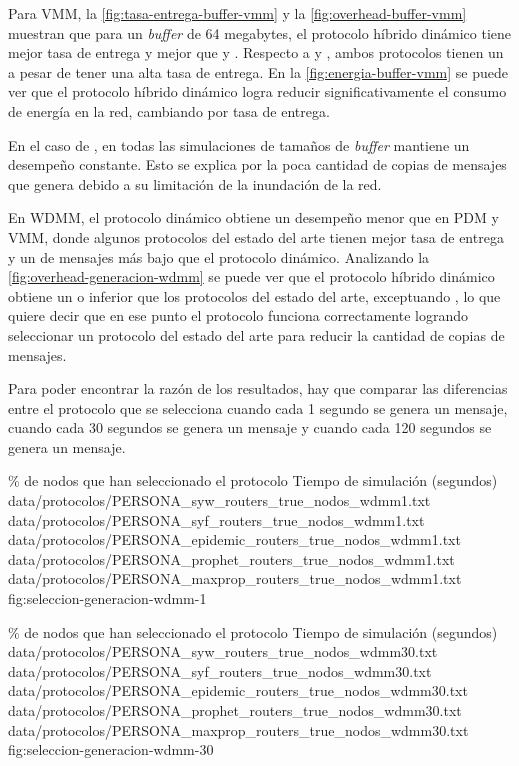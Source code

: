 Para VMM, la \ref{fig:tasa-entrega-buffer-vmm} y la
\ref{fig:overhead-buffer-vmm} muestran que para un \textit{buffer} de 64
megabytes, el protocolo híbrido dinámico tiene mejor tasa de entrega y mejor
\overhead{} que \prophet{} y \epidemic. Respecto a \maxprop{} y \syf, ambos
protocolos tienen un \overhead{} a pesar de tener una alta tasa de entrega. En
la \ref{fig:energia-buffer-vmm} se puede ver que el protocolo híbrido dinámico
logra reducir significativamente el consumo de energía en la red, cambiando
\overhead{} por tasa de entrega.


En el caso de \syw, en todas las simulaciones de tamaños de \textit{buffer}
mantiene un desempeño constante. Esto se explica por la poca cantidad de copias
de mensajes que genera debido a su limitación de la inundación de la red.




En WDMM, el protocolo dinámico obtiene un desempeño menor que en PDM y VMM,
donde algunos protocolos del estado del arte tienen mejor tasa de entrega y un
\overhead{} de mensajes más bajo que el protocolo dinámico. Analizando la
\ref{fig:overhead-generacion-wdmm} se puede ver que el protocolo híbrido
dinámico obtiene un \overhead{} o inferior que los protocolos del estado del
arte, exceptuando \syw, lo que quiere decir que en ese punto el protocolo
funciona correctamente logrando seleccionar un protocolo del estado del arte
para reducir la cantidad de copias de mensajes.

Para poder encontrar la razón de los resultados, hay que comparar las
diferencias entre el protocolo que se selecciona cuando cada 1 segundo se genera
un mensaje, cuando cada 30 segundos se genera un mensaje y cuando cada 120
segundos se genera un mensaje.


{
\graficoProtocolosTiempo
{\% de nodos que han seleccionado el protocolo}
{Tiempo de simulación (segundos)}
{data/protocolos/PERSONA_syw_routers_true_nodos_wdmm1.txt}
{data/protocolos/PERSONA_syf_routers_true_nodos_wdmm1.txt}
{data/protocolos/PERSONA_epidemic_routers_true_nodos_wdmm1.txt}
{data/protocolos/PERSONA_prophet_routers_true_nodos_wdmm1.txt}
{data/protocolos/PERSONA_maxprop_routers_true_nodos_wdmm1.txt}
}{fig:seleccion-generacion-wdmm-1}


{
\graficoProtocolosTiempo
{\% de nodos que han seleccionado el protocolo}
{Tiempo de simulación (segundos)}
{data/protocolos/PERSONA_syw_routers_true_nodos_wdmm30.txt}
{data/protocolos/PERSONA_syf_routers_true_nodos_wdmm30.txt}
{data/protocolos/PERSONA_epidemic_routers_true_nodos_wdmm30.txt}
{data/protocolos/PERSONA_prophet_routers_true_nodos_wdmm30.txt}
{data/protocolos/PERSONA_maxprop_routers_true_nodos_wdmm30.txt}
}{fig:seleccion-generacion-wdmm-30}


